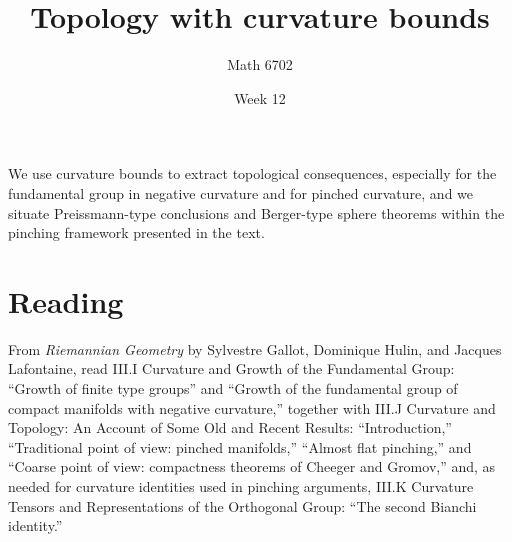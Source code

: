 \documentclass{article}
\title{Topology with curvature bounds}
\author{Math 6702}
\date{Week 12}
\begin{document}
\maketitle

We use curvature bounds to extract topological consequences, especially for the fundamental group in negative curvature and for pinched curvature, and we situate Preissmann-type conclusions and Berger-type sphere theorems within the pinching framework presented in the text.

\section*{Reading}
From \textit{Riemannian Geometry} by Sylvestre Gallot, Dominique Hulin, and Jacques Lafontaine, read \textsection III.I Curvature and Growth of the Fundamental Group: ``Growth of finite type groups'' and ``Growth of the fundamental group of compact manifolds with negative curvature,'' together with \textsection III.J Curvature and Topology: An Account of Some Old and Recent Results: ``Introduction,'' ``Traditional point of view: pinched manifolds,'' ``Almost flat pinching,'' and ``Coarse point of view: compactness theorems of Cheeger and Gromov,'' and, as needed for curvature identities used in pinching arguments, \textsection III.K Curvature Tensors and Representations of the Orthogonal Group: ``The second Bianchi identity.''
\end{document}
